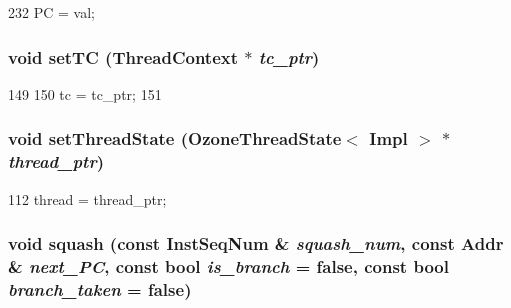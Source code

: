 \begin{DoxyCode}
232 { PC = val; }
\end{DoxyCode}
\hypertarget{classFrontEnd_ac6ccaaea6ac518cab92f71723b5a739e}{
\subsubsection[{setTC}]{\setlength{\rightskip}{0pt plus 5cm}void setTC ({\bf ThreadContext} $\ast$ {\em tc\_\-ptr})}}
\label{classFrontEnd_ac6ccaaea6ac518cab92f71723b5a739e}



\begin{DoxyCode}
149 {
150     tc = tc_ptr;
151 }
\end{DoxyCode}
\hypertarget{classFrontEnd_a2a6551551e11d9e1947d6805e8322757}{
\subsubsection[{setThreadState}]{\setlength{\rightskip}{0pt plus 5cm}void setThreadState ({\bf OzoneThreadState}$<$ Impl $>$ $\ast$ {\em thread\_\-ptr})}}
\label{classFrontEnd_a2a6551551e11d9e1947d6805e8322757}



\begin{DoxyCode}
112     { thread = thread_ptr; }
\end{DoxyCode}
\hypertarget{classFrontEnd_a2b2ddbfb364763ee4f0f337c79d436d9}{
\subsubsection[{squash}]{\setlength{\rightskip}{0pt plus 5cm}void squash (const {\bf InstSeqNum} \& {\em squash\_\-num}, \/  const {\bf Addr} \& {\em next\_\-PC}, \/  const bool {\em is\_\-branch} = {\ttfamily false}, \/  const bool {\em branch\_\-taken} = {\ttfamily false})}}
\label{classFrontEnd_a2b2ddbfb364763ee4f0f337c79d436d9}



